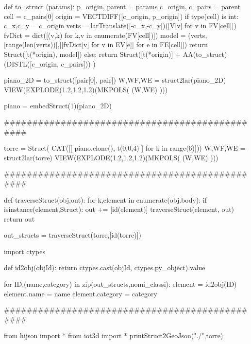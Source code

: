 def to_struct (params):
    p_origin, parent = params
    c_origin, c_pairs = parent
    cell = c_pairs[0]
    origin = VECTDIFF([c_origin, p_origin])
    if type(cell) is int:        
        c_x,c_y = c_origin
        verts = larTranslate([-c_x,-c_y])([V[v] for v in FV[cell]])
        fvDict = dict([(v,k) for k,v in enumerate(FV[cell])])
        model = (verts,[range(len(verts))],[[fvDict[v] for v in EV[e]] for e in FE[cell]])
        return Struct([t(*origin), model])
    else:
        return Struct([t(*origin)] + AA(to_struct)(DISTL([c_origin, c_pairs])) )


piano_2D = to_struct([pair[0], pair])
W,WF,WE = struct2lar(piano_2D)
VIEW(EXPLODE(1.2,1.2,1.2)(MKPOLS( (W,WE) )))

piano = embedStruct(1)(piano_2D)


###############################################



torre = Struct( CAT([[ piano.clone(), t(0,0,4) ] for k in range(6)]))
W,WF,WE = struct2lar(torre)
VIEW(EXPLODE(1.2,1.2,1.2)(MKPOLS( (W,WE) )))




###############################################



def traverseStruct(obj,out):
    for k,element in enumerate(obj.body):
        if isinstance(element,Struct): 
            out += [id(element)]
            traverseStruct(element, out)
    return out

out_structs = traverseStruct(torre,[id(torre)])

import ctypes

def id2obj(objId):
	return ctypes.cast(objId, ctypes.py_object).value


for ID,(name,category) in zip(out_structs,nomi_classi):
    element = id2obj(ID)
    element.name = name
    element.category = category



###############################################



from hijson import *
from iot3d import *
printStruct2GeoJson("./",torre)






